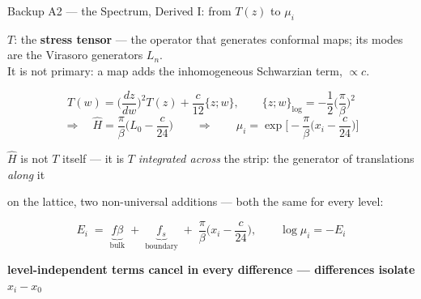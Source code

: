 \documentclass[aspectratio=169,11pt]{beamer}
\newcommand{\idea}[1]{\begin{center}\color{accent!80!black}\textbf{#1}\end{center}}
\begin{document}
\begin{frame}{Backup A2 --- the Spectrum, Derived I: from $T(z)$ to $\mu_i$}
  \vspace{-0.2em}
  \begin{center}\small\color{ink!75}
    $T$: the \textbf{stress tensor} --- the operator that generates conformal
    maps; its modes are the Virasoro generators $L_n$.\\[0.2ex]
    It is not primary: a map adds the inhomogeneous Schwarzian term,
    $\propto c$.
  \end{center}
  \vspace{-0.2em}
  \[
    T(w) = \Big(\frac{dz}{dw}\Big)^2 T(z) + \frac{c}{12}\{z;w\},
    \qquad
    \{z;w\}_{\log} = -\frac12\Big(\frac{\pi}{\beta}\Big)^2
  \]
  \[
    \Longrightarrow\quad
    \hat H = \frac{\pi}{\beta}\Big(L_0 - \frac{c}{24}\Big)
    \qquad\Longrightarrow\qquad
    \mu_i = \exp\Big[-\frac{\pi}{\beta}\Big(x_i - \frac{c}{24}\Big)\Big]
  \]
  \vspace{-0.6em}
  \begin{center}\small\color{ink!75}
    $\hat H$ is not $T$ itself --- it is $T$ \emph{integrated across} the
    strip: the generator of translations \emph{along} it
  \end{center}
  \begin{center}\small
    on the lattice, two non-universal additions --- both the same for
    every level:
  \end{center}
  \[
    E_i \;=\; \underbrace{f\beta}_{\text{bulk}}
    \;+\; \underbrace{f_s}_{\text{boundary}}
    \;+\; \frac{\pi}{\beta}\Big(x_i - \frac{c}{24}\Big),
    \qquad \log\mu_i = -E_i
  \]
  \idea{level-independent terms cancel in every difference ---
    differences isolate $x_i - x_0$}
\end{frame}
\end{document}
